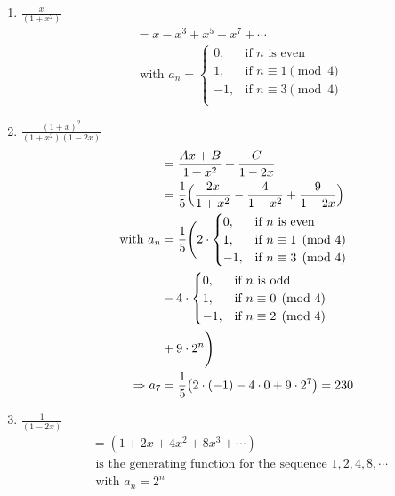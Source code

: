 \documentclass[a4paper]{article}
\begin{document}
\begin{enumerate}
    \item $\frac{x}{(1+x^2)}$
    \begin{align*}
        &=x-x^3+x^5-x^7+\cdots\\
        &\text{ with } a_n= 
            \begin{cases}
            0,  & \text{if $n$ is even} \\
            1,  & \text{if $n\equiv 1\pmod  4$} \\
            -1, & \text{if $n\equiv 3\pmod  4$} \\
            \end{cases}
    \end{align*}
    
    \item $\frac{(1+x)^2}{(1+x^2)(1-2x)}$
    \begin{align*}
        &=\frac{Ax+B}{1+x^2}+\frac{C}{1-2x}\\
        &=\frac{1}{5}\Bigl(\frac{2x}{1+x^2}-\frac{4}{1+x^2}+\frac{9}{1-2x}\Bigr)\\
        \text{ with } a_n&=\frac{1}{5}\Biggl(2\cdot
            \begin{cases}
            0,  & \text{if $n$ is even} \\
            1,  & \text{if $n\equiv 1\pmod  4$} \\
            -1, & \text{if $n\equiv 3\pmod  4$} \\
            \end{cases}\\
        &
            -4\cdot
            \begin{cases}
            0,  & \text{if $n$ is odd} \\
            1,  & \text{if $n\equiv 0\pmod  4$} \\
            -1, & \text{if $n\equiv 2\pmod  4$} \\
            \end{cases}\\
        & 
            +9\cdot 2^n 
            \Biggr)\\
        \Rightarrow a_7&=\frac{1}{5}\bigl(2\cdot(-1)-4\cdot 0 + 9\cdot 2^7\bigr)=230
    \end{align*}
    
    \item $\frac{1}{(1-2x)}$
    \begin{align*}
        &=(1+2x+4x^2+8x^3+\cdots)\\
        &\text{ is the generating function for the sequence } 1,2,4,8,\cdots\\
        &\text{ with } a_n=2^n
    \end{align*}
    

\end{enumerate}
\end{document}
